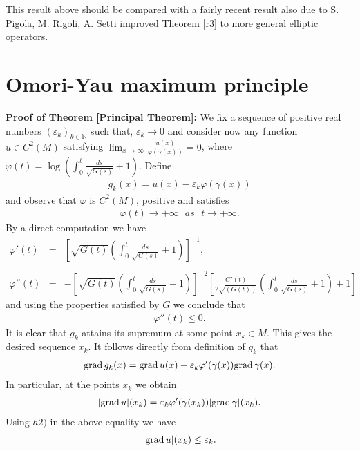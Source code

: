 \documentclass[a4paper]{amsart}
\begin{document}
This result above should be compared with  a fairly recent result \cite[Cor. A1.]{prs-jfa} also due to S. Pigola, M. Rigoli, A. Setti improved Theorem \ref{r3} to more general elliptic operators.

\vspace{.2mm}

\section{Omori-Yau maximum principle}\label{sec-main}

\textbf{Proof of Theorem \ref{Principal Theorem}:}
We fix a sequence of positive real numbers $(\varepsilon_{k})_{k \in \mathbb{N}}$ such that, $ \varepsilon_{k} \rightarrow 0$ and \linebreak
consider now any function $u \in C^{2}(M)$ satisfying $
\displaystyle{\lim_{x \rightarrow \infty}\frac{u(x)}{\varphi(\gamma(x))}} = 0
$, where \linebreak
$
\displaystyle{\varphi(t) = \log\left(\int_{0}^{t}\frac{ds}{\sqrt{G(s)}}+1\right)}
$. Define
\begin{eqnarray}\label{defgk}
g_{k}(x) = u(x) - \varepsilon_{k}\varphi(\gamma(x))
\end{eqnarray}
and observe that $\varphi $ is $C^{2}(M)$, positive and satisfies
\begin{eqnarray*}
\varphi(t) \rightarrow +\infty  \,\,\,\, as \,\,\,\, t\rightarrow  +\infty .
\end{eqnarray*}
By a direct computation we have
\begin{eqnarray}\label{filinha}
\varphi'(t)&=& \left[\sqrt{G(t)}\left(\int_{0}^{t}\frac{ds}{\sqrt{G(s)}} + 1\right)\right]^{-1},\nonumber \\
&& \nonumber \\
\varphi''(t) &=& - \left[\sqrt{G(t)}\left(\int_{0}^{t}\frac{ds}{\sqrt{G(s)}} + 1\right)\right]^{-2}\left[\frac{G'(t)}{2\sqrt{(G(t))}}\left(\int_{0}^{t}\frac{ds}{\sqrt{G(s)}} + 1\right) + 1 \right]\nonumber
\end{eqnarray}
and using the properties satisfied by $G$ we conclude that
\begin{eqnarray}\label{fiduaslinha}
\varphi''(t) \leq 0.
\end{eqnarray}
It is clear that $g_{k}$ attains its supremum at some point $x_{k} \in M$. This gives the desired sequence $x_k$. It follows directly from definition of $g_{k} $ that
\begin{eqnarray*}
{{{\rm{grad}\,}}} g_{k}(x) = {{{\rm{grad}\,}}} u(x) - \varepsilon_{k}\varphi'(\gamma(x)){{{\rm{grad}\,}}} \gamma(x).
\end{eqnarray*}
In particular, at the points $x_{k}$ we obtain
\begin{eqnarray}\label{ig1}
\vert {{{\rm{grad}\,}}} u\vert(x_k) = \varepsilon_{k}\varphi'(\gamma(x_{k}))\vert {{{\rm{grad}\,}}} \gamma \vert(x_{k}).
\end{eqnarray}
Using $h2)$  in the above equality we have
\begin{eqnarray*}
\vert {{{\rm{grad}\,}}} u\vert (x_k) \leq \varepsilon_{k}.
\end{eqnarray*}
\end{document}
